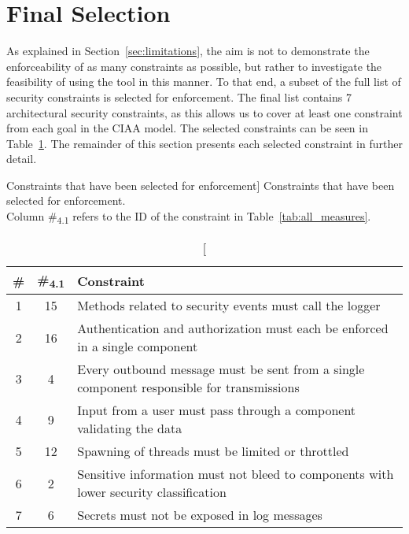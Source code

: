 \section{Final Selection}

As explained in Section~\ref{sec:limitations}, the aim is not to demonstrate the enforceability of as many constraints as possible, but rather to investigate the feasibility of using the tool in this manner. To that end, a subset of the full list of security constraints is selected for enforcement. The final list contains 7 architectural security constraints, as this allows us to cover at least one constraint from each goal in the CIAA model. The selected constraints can be seen in Table~\ref{tab:selected_measures}. The remainder of this section presents each selected constraint in further detail.

\begin{table}
\captionsetup{justification=centering}
\caption
    [Constraints that have been selected for enforcement]
    {Constraints that have been selected for enforcement.\\Column \#\textsubscript{4.1} refers to the ID of the constraint in Table~\ref{tab:all_measures}.}
\begin{center}
\begin{tabular}{ccp{12.4cm}}
\hline
\textbf{\#} & \textbf{\#\textsubscript{4.1}} & \textbf{Constraint} \\
\hline
1 & 15 & Methods related to security events must call the logger\\
\rowcolor{RowColor}
2 & 16 & Authentication and authorization must each be enforced in a single component\\
3 & 4 & Every outbound message must be sent from a single component responsible for transmissions\\
\rowcolor{RowColor}
4 & 9 & Input from a user must pass through a component validating the data\\
5 & 12 & Spawning of threads must be limited or throttled\\
\rowcolor{RowColor}
6 & 2 & Sensitive information must not bleed to components with lower security classification\\
7 & 6 & Secrets must not be exposed in log messages\\
\hline
\end{tabular}
\end{center}
\label{tab:selected_measures}
\end{table}


